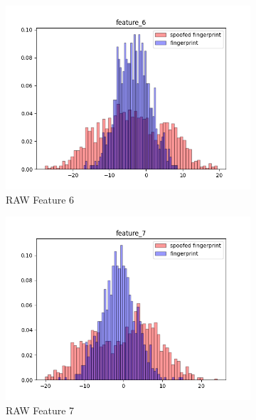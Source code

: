 \documentclass[english]{report}
\begin{document}
\begin{figure}[h!]
\begin{subfigure}{0.3\textwidth}
        \includegraphics[scale=0.3]{../../images/feature_plot/hist_feature_6}
        \caption{RAW Feature 6}
    \end{subfigure}
    \begin{subfigure}{0.3\textwidth}
        \includegraphics[scale=0.3]{../../images/feature_plot/hist_feature_7}
        \caption{RAW Feature 7}
    \end{subfigure}
    \begin{subfigure}{0.3\textwidth}

\end{subfigure}
\end{figure}
\end{document}
